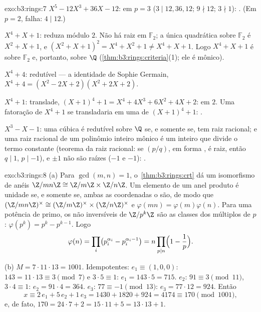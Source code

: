 \begin{solution}{exo:b3:rings:7}
\emph{$X^5 - 12X^3 + 36X - 12$}:  em $p = 3$ ($3 \mid
12, 36, 12$; $9 \nmid 12$; $3 \nmid 1$):
. (Em $p = 2$,  falha: $4 \mid 12$.)

\emph{$X^4 + X + 1$}: reduza módulo $2$. Não há raiz em $\mathbb F_2$; a única
quadrática  sobre $\mathbb F_2$ é $X^2 + X +
1$, e $(X^2+X+1)^2 = X^4 + X^2 + 1 \neq X^4 + X + 1$. Logo $X^4 +
X + 1$ é
 sobre $\mathbb F_2$ e, portanto, sobre $\Q$
(\cref{thm:b3:rings:criteria}(1); ele é mônico).

\emph{$X^4 + 4$}: redutível --- a identidade de Sophie Germain, $X^4 + 4 = (X^2 - 2X + 2)(X^2 + 2X + 2)$.

\emph{$X^4 + 1$}: translade, $(X+1)^4 + 1 = X^4 + 4X^3 + 6X^2 + 4X +
2$:  em $2$. Uma fatoração de
$X^4+1$ se transladaria em uma de $(X+1)^4 + 1$: .

\emph{$X^3 - X - 1$}: uma cúbica é redutível sobre $\Q$ se, e somente se, tem
raiz racional; e uma raiz racional de um polinômio inteiro mônico é um
inteiro que divide o termo constante (teorema da raiz racional: se
$(p/q)$, em forma , é raiz, então $q \mid 1$, $p \mid -1$), e
$\pm 1$ não são raízes ($-1$ e $-1$): .
\end{solution}

\begin{solution}{exo:b3:rings:8}
(a) Para $\gcd(m, n) = 1$, o~\cref{thm:b3:rings:crt} dá um isomorfismo de anéis $\Z/mn\Z \cong \Z/m\Z \times \Z/n\Z$. Um
elemento de um anel produto é unidade se, e somente se, ambas as
coordenadas o são, de modo que $(\Z/mn\Z)^\times \cong (\Z/m\Z)^\times \times (\Z/n\Z)^\times$ e $\varphi(mn) = \varphi(m)\varphi(n)$. Para uma potência de
primo, os não inversíveis de $\Z/p^k\Z$ são as classes dos múltiplos de
$p$: $\varphi(p^k) = p^k - p^{k-1}$. Logo
\[
\varphi(n) = \prod_i \bigl(p_i^{\alpha_i} -
p_i^{\alpha_i-1}\bigr) = n \prod_{p \mid n}\Bigl(1 -
\frac1p\Bigr).
\]

(b) $M = 7 \cdot 11 \cdot 13 = 1001$. Idempotentes: $e_1 \equiv
(1, 0, 0)$: $143 = 11\cdot13 \equiv 3 \pmod 7$ e $3 \cdot 5
\equiv 1$: $e_1 = 143 \cdot 5 = 715$. $e_2$: $91 \equiv 3
\pmod{11}$,
$3 \cdot 4 \equiv 1$: $e_2 = 91\cdot4 = 364$. $e_3$: $77 \equiv -1 \pmod{13}$: $e_3 = 77 \cdot 12 = 924$. Então
\[
x \equiv 2\,e_1 + 5\,e_2 + 1\,e_3 = 1430 + 1820 + 924 = 4174
\equiv 170 \pmod{1001},
\]
e, de fato, $170 = 24\cdot7 + 2 = 15\cdot11 + 5 = 13\cdot13 + 1$.
\end{solution}

